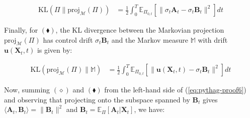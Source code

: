 \documentclass{article}
\begin{document}
\begin{small}
\begin{align}
    \text{KL}(\Pi\|\text{proj}_{\mathcal{M}}(\Pi))&=\frac{1}{2}\int_0^T\mathbb{E}_{\Pi_{0,t}}\left[\|\sigma_t\boldsymbol{A}_t-\sigma_t\boldsymbol{B}_t\|^2\right]dt
\end{align}
\end{small}
Finally, for $(\blacklozenge)$, the KL divergence between the Markovian projection $\text{proj}_{\mathcal{M}}(\Pi)$ has control drift $\sigma_t\boldsymbol{B}_t$ and the Markov measure $\mathbb{M}$ with drift $\boldsymbol{u}(\boldsymbol{X}_t,t)$ is given by:
\begin{small}
\begin{align}
    \text{KL}(\text{proj}_{\mathcal{M}}(\Pi)\|\mathbb{M})&=\frac{1}{2}\int_0^T\mathbb{E}_{\Pi_{0,t}}\left[\|\boldsymbol{u}(\boldsymbol{X}_t,t)-\sigma_t\boldsymbol{B}_t\|^2\right]dt
\end{align}
\end{small}
Now, summing $(\diamond)$ and $(\blacklozenge)$ from the left-hand side of (\ref{eq:pythag-proof6}) and observing that projecting onto the subspace spanned by $\boldsymbol{B}_t$ gives $\langle\boldsymbol{A}_t,\boldsymbol{B}_t\rangle =\|\boldsymbol{B}_t\|^2$ and $\boldsymbol{B}_t=\mathbb{E}_{\Pi}[\boldsymbol{A}_t|\boldsymbol{X}_t]$, we have:
\end{document}
